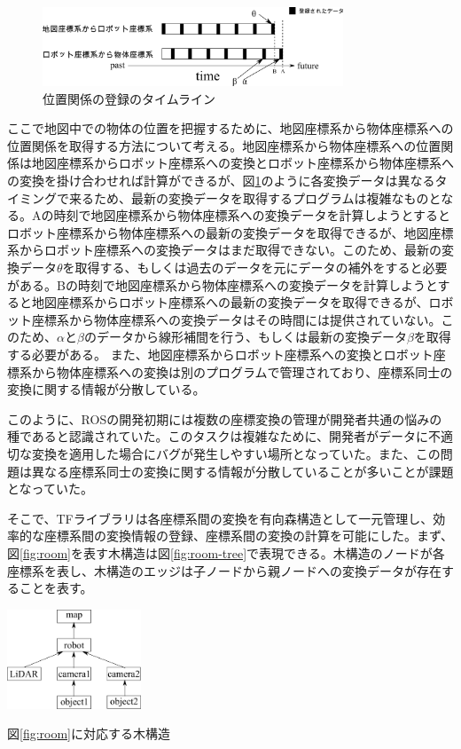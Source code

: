 \documentclass{jarticle}
\begin{document}
\begin{multicols}{2}
\begin{figure} 
\centering
\includegraphics[width=0.8\textwidth]{sensor-sync}	
\caption{位置関係の登録のタイムライン}
\label{fig:sensor-sync}
\end{figure}


ここで地図中での物体の位置を把握するために、地図座標系から物体座標系への位置関係を取得する方法について考える。地図座標系から物体座標系への位置関係は地図座標系からロボット座標系への変換とロボット座標系から物体座標系への変換を掛け合わせれば計算ができるが、図\ref{fig:sensor-sync}のように各変換データは異なるタイミングで来るため、最新の変換データを取得するプログラムは複雑なものとなる。Aの時刻で地図座標系から物体座標系への変換データを計算しようとするとロボット座標系から物体座標系への最新の変換データを取得できるが、地図座標系からロボット座標系への変換データはまだ取得できない。このため、最新の変換データ$\theta$を取得する、もしくは過去のデータを元にデータの補外をすると必要がある。Bの時刻で地図座標系から物体座標系への変換データを計算しようとすると地図座標系からロボット座標系への最新の変換データを取得できるが、ロボット座標系から物体座標系への変換データはその時間には提供されていない。このため、$\alpha$と$\beta$のデータから線形補間を行う、もしくは最新の変換データ$\beta$を取得する必要がある。
また、地図座標系からロボット座標系への変換とロボット座標系から物体座標系への変換は別のプログラムで管理されており、座標系同士の変換に関する情報が分散している。

このように、ROSの開発初期には複数の座標変換の管理が開発者共通の悩みの種であると認識されていた。このタスクは複雑なために、開発者がデータに不適切な変換を適用した場合にバグが発生しやすい場所となっていた。また、この問題は異なる座標系同士の変換に関する情報が分散していることが多いことが課題となっていた。

そこで、TFライブラリは各座標系間の変換を有向森構造として一元管理し、効率的な座標系間の変換情報の登録、座標系間の変換の計算を可能にした。まず、図\ref{fig:room}を表す木構造は図\ref{fig:room-tree}で表現できる。木構造のノードが各座標系を表し、木構造のエッジは子ノードから親ノードへの変換データが存在することを表す。

\begin{figurehere} 
\centering
\includegraphics[width=0.3\textwidth]{tree}	
\caption{図\ref{fig:room}に対応する木構造}
\label{fig:room-tree}
\end{figurehere}


\end{multicols}
\end{document}
